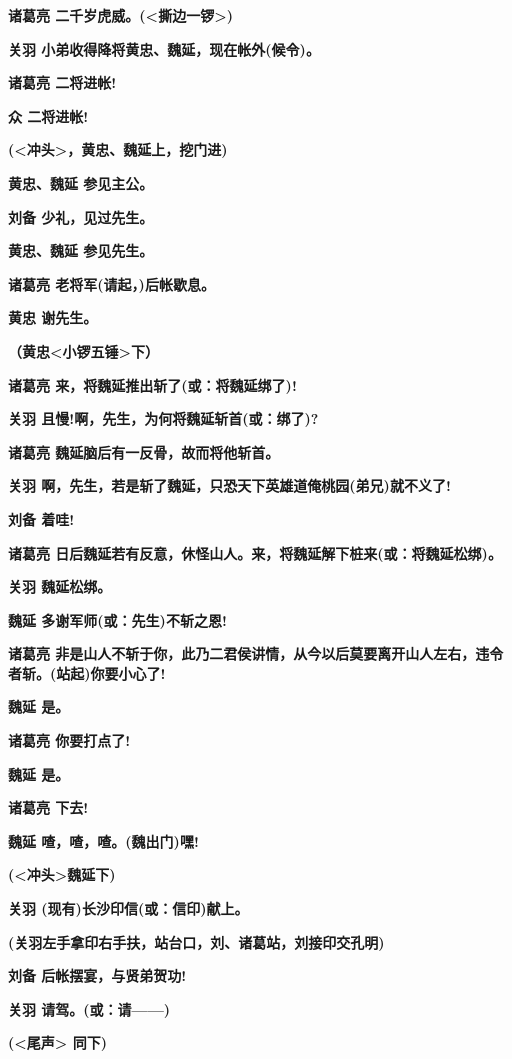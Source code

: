 \textbf{诸葛亮 二千岁虎威。(\textless{}撕边一锣\textgreater{})}

\textbf{关羽 小弟收得降将黄忠、魏延，现在帐外(候令)。}

\textbf{诸葛亮 二将进帐!}

\textbf{众 二将进帐!}

\textbf{(\textless{}冲头\textgreater{}，黄忠、魏延上，挖门进)}

\textbf{黄忠、魏延 参见主公。}

\textbf{刘备 少礼，见过先生。}

\textbf{黄忠、魏延 参见先生。}

\textbf{诸葛亮 老将军(请起，)后帐歇息。}

\textbf{黄忠 谢先生。}

\textbf{（黄忠\textless{}小锣五锤\textgreater{}下）}

\textbf{诸葛亮 来，将魏延推出斩了(或：将魏延绑了)!}

\textbf{关羽 且慢!啊，先生，为何将魏延斩首(或：绑了)?}

\textbf{诸葛亮 魏延脑后有一反骨，故而将他斩首。}

\textbf{关羽
啊，先生，若是斩了魏延，只恐天下英雄道俺桃园(弟兄)就不义了!}

\textbf{刘备 着哇!}

\textbf{诸葛亮
日后魏延若有反意，休怪山人。来，将魏延解下桩来(或：将魏延松绑)。}

\textbf{关羽 魏延松绑。}

\textbf{魏延 多谢军师(或：先生)不斩之恩!}

\textbf{诸葛亮
非是山人不斩于你，此乃二君侯讲情，从今以后莫要离开山人左右，违令者斩。(站起)你要小心了!}

\textbf{魏延 是。}

\textbf{诸葛亮 你要打点了!}

\textbf{魏延 是。}

\textbf{诸葛亮 下去!}

\textbf{魏延 喳，喳，喳。(魏出门)嘿!}

\textbf{(\textless{}冲头\textgreater{}魏延下)}

\textbf{关羽 (现有)长沙印信(或：信印)献上。}

\textbf{(关羽左手拿印右手扶，站台口，刘、诸葛站，刘接印交孔明)}

\textbf{刘备 后帐摆宴，与贤弟贺功!}

\textbf{关羽 请驾。(或：请------)}

\textbf{(\textless{}尾声\textgreater{} 同下)}

